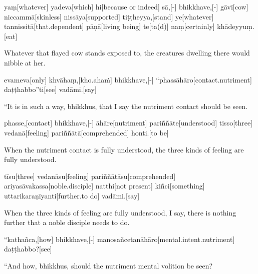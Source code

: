\begin{samepage}
\begingl[glneveryline={\PaliGlossA,\PaliGlossB}]
yaṃ[whatever] yadeva[which] hi[because or indeed] sā,[-] bhikkhave,[-] gāvī[cow] niccammā[skinless] nissāya[supported] tiṭṭheyya,[stand] ye[whatever] tannissitā[that.dependent] pāṇā[living being] te[ta(d)] naṃ[certainly] khādeyyuṃ.[eat]
\endgl
\nopagebreak
\linespread{0.5}
\begin{spacin}{0.2}
{\PaliGlossFT Whatever that flayed cow stands exposed to, the creatures dwelling there would nibble at her.}
\end{spacin}
\vskip 12pt
\end{samepage}
\begin{samepage}
\begingl[glneveryline={\PaliGlossA,\PaliGlossB}]
evameva[only] khvāhaṃ,[kho.ahaṁ] bhikkhave,[-] “phassāhāro[contact.nutriment] daṭṭhabbo”ti[see] vadāmi.[say]
\endgl
\nopagebreak
\linespread{0.5}
\begin{spacin}{0.2}
{\PaliGlossFT “It is in such a way, bhikkhus, that I say the nutriment contact should be seen.}
\end{spacin}
\vskip 12pt
\end{samepage}
\begin{samepage}
\begingl[glneveryline={\PaliGlossA,\PaliGlossB}]
phasse,[contact] bhikkhave,[-] āhāre[nutriment] pariññāte[understood] tisso[three] vedanā[feeling] pariññātā[comprehended] honti.[to be]
\endgl
\nopagebreak
\linespread{0.5}
\begin{spacin}{0.2}
{\PaliGlossFT When the nutriment contact is fully understood, the three kinds of feeling are fully understood.}
\end{spacin}
\vskip 12pt
\end{samepage}
\begin{samepage}
\begingl[glneveryline={\PaliGlossA,\PaliGlossB}]
tīsu[three] vedanāsu[feeling] pariññātāsu[comprehended] ariyasāvakassa[noble.disciple] natthi[not present] kiñci[something] uttarikaraṇīyanti[further.to do] vadāmi.[say]
\endgl
\nopagebreak
\linespread{0.5}
\begin{spacin}{0.2}
{\PaliGlossFT When the three kinds of feeling are fully understood, I say, there is nothing further that a noble disciple needs to do.}
\end{spacin}
\vskip 12pt
\end{samepage}
\vskip 0.2in
\begin{samepage}
\begingl[glneveryline={\PaliGlossA,\PaliGlossB}]
“kathañca,[how] bhikkhave,[-] manosañcetanāhāro[mental.intent.nutriment] daṭṭhabbo?[see]
\endgl
\nopagebreak
\linespread{0.5}
\begin{spacin}{0.2}
{\PaliGlossFT “And how, bhikkhus, should the nutriment mental volition be seen?}
\end{spacin}
\vskip 12pt
\end{samepage}
